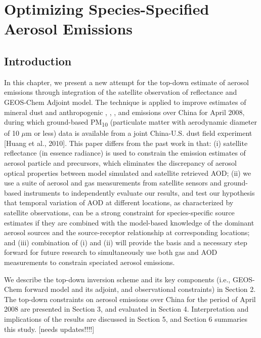 \chapter{Optimizing Species-Specified Aerosol Emissions} \label{chap:}

\section{Introduction}

 In this chapter, we present a new attempt for the top-down estimate 
 of aerosol emissions through integration of the satellite observation 
 of reflectance and GEOS-Chem Adjoint model. 
 The technique is applied to improve estimates of mineral dust 
 and anthropogenic , , ,  and  
 emissions over China for April 2008, during which ground-based 
 PM\textsubscript{10} (particulate matter with aerodynamic diameter of 
 10 $\mu$m or less) data is available from a joint China-U.S. 
 dust field experiment [Huang et al., 2010]. 
 This paper differs from the past work in that: 
 (i) satellite reflectance (in essence radiance) is used 
 to constrain the emission estimates of aerosol particle and precursors, 
 which eliminates the discrepancy of aerosol optical properties 
 between model simulated and satellite retrieved AOD; 
 (ii) we use a suite of aerosol and gas measurements 
 from satellite sensors and ground-based instruments 
 to independently evaluate our results, and test our hypothesis 
 that temporal variation of AOD at different locations, 
 as characterized by satellite observations, can be a strong constraint 
 for species-specific source estimates if they are combined with 
 the model-based knowledge of the dominant aerosol sources 
 and the source-receptor relationship at corresponding locations; 
 and (iii) combination of (i) and (ii) will provide the basis and 
 a necessary step forward for future research to simultaneously 
 use both gas and AOD measurements to constrain speciated aerosol emissions. 

 We describe the top-down inversion scheme and its key components 
 (i.e., GEOS-Chem forward model and its adjoint, and observational constraints) 
 in Section 2. The top-down constraints on aerosol emissions over China 
 for the period of April 2008 are presented in Section 3, 
 and evaluated in Section 4. Interpretation and 
 implications of the results are discussed in Section 5, 
 and Section 6 summaries this study. [needs updates!!!!]

